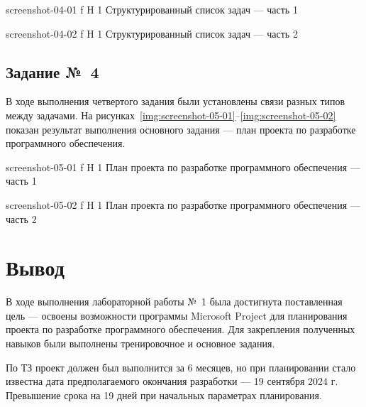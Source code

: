 \documentclass{bmstu}
\begin{document}
    {screenshot-04-01}
    {f}
    {H}
    {1\textwidth}
    {Структурированный список задач --- часть 1}
    
    {screenshot-04-02}
    {f}
    {H}
    {1\textwidth}
    {Структурированный список задач --- часть 2}

\subsection{Задание №~4}

В ходе выполнения четвертого задания были установлены связи разных типов между задачами. 
На рисунках~\ref{img:screenshot-05-01}--\ref{img:screenshot-05-02} показан результат выполнения основного задания --- план проекта по разработке программного обеспечения.
    
    {screenshot-05-01}
    {f}
    {H}
    {1\textwidth}
    {План проекта по разработке программного обеспечения --- часть 1}
    
    {screenshot-05-02}
    {f}
    {H}
    {1\textwidth}
    {План проекта по разработке программного обеспечения --- часть 2}
    
\section{Вывод}

В ходе выполнения лабораторной работы №~1 была достигнута поставленная цель --- освоены возможности программы Microsoft Project для планирования проекта по разработке программного обеспечения. 
Для закрепления полученных навыков были выполнены тренировочное и основное задания.

По ТЗ проект должен был выполнится за 6 месяцев, но при планировании стало известна дата предполагаемого окончания разработки --- 19 сентября 2024 г. 
Превышение срока на 19 дней при начальных параметрах планирования.
\end{document}

